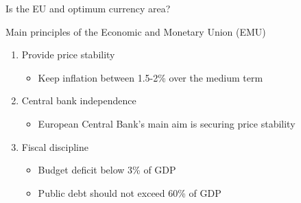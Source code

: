\documentclass{beamer}
\begin{document}
\begin{frame}{Is the EU and optimum currency area?}
  \begin{table}[!h] \centering \label{table:summary}
\end{table}
\end{frame}

\begin{frame}{Main principles of the Economic and Monetary Union (EMU)}
  \begin{enumerate}
    \item Provide price stability
    \begin{itemize}
      \item Keep inflation between 1.5-2\% over the medium term
    \end{itemize}
    \medskip
    \item Central bank independence
    \begin{itemize}
      \item European Central Bank's main aim is securing price stability
    \end{itemize}
    \medskip
    \item Fiscal discipline
    \begin{itemize}
      \item Budget deficit below 3\% of GDP
      \item Public debt should not exceed 60\% of GDP
    \end{itemize}
  \end{enumerate}
\end{frame}
\end{document}

